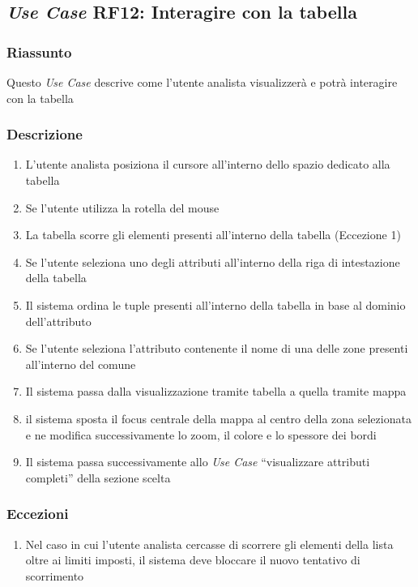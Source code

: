     \subsection{\textit{Use Case} RF12: Interagire con la tabella}
        \subsubsection{Riassunto}
            Questo \textit{Use Case} descrive come l'utente analista visualizzerà e potrà interagire con la tabella
        \subsubsection{Descrizione}
            \begin{enumerate}
                \item L'utente analista posiziona il cursore all'interno dello spazio dedicato alla tabella
                \item Se l'utente utilizza la rotella del mouse
                \item La tabella scorre gli elementi presenti all'interno della tabella (Eccezione 1)
                \item Se l'utente seleziona uno degli attributi all'interno della riga di intestazione della tabella
                \item Il sistema ordina le tuple presenti all'interno della tabella in base al dominio dell'attributo
                \item Se l'utente seleziona l'attributo contenente il nome di una delle zone presenti all'interno del comune
                \item Il sistema passa dalla visualizzazione tramite tabella a quella tramite mappa
                \item il sistema sposta il focus centrale della mappa al centro della zona selezionata e ne modifica successivamente lo zoom, il colore e lo spessore dei bordi
                \item Il sistema passa successivamente allo \textit{Use Case} ``visualizzare attributi completi'' della sezione scelta
            \end{enumerate}
        \subsubsection{Eccezioni}
            \begin{enumerate}
                \item Nel caso in cui l'utente analista cercasse di scorrere gli elementi della lista oltre ai limiti imposti, il sistema deve bloccare il nuovo tentativo di scorrimento
            \end{enumerate}
